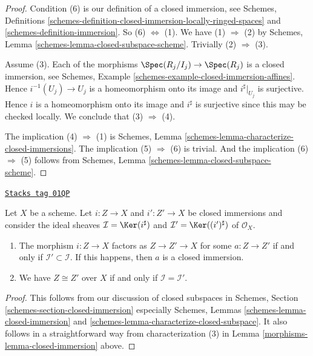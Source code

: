 \begin{proof}
Condition (6) is our definition of a closed immersion, see Schemes,
Definitions \ref{schemes-definition-closed-immersion-locally-ringed-spaces}
and \ref{schemes-definition-immersion}.
So (6) $\Leftrightarrow$ (1). We have (1) $\Rightarrow$ (2) by
Schemes, Lemma \ref{schemes-lemma-closed-subspace-scheme}.
Trivially (2) $\Rightarrow$ (3).

\medskip\noindent
Assume (3). Each of the morphisms
$\Spec(R_j/I_j) \to \Spec(R_j)$ is
a closed immersion, see
Schemes, Example \ref{schemes-example-closed-immersion-affines}.
Hence $i^{-1}(U_j) \to U_j$ is a homeomorphism onto its image
and $i^\sharp|_{U_j}$ is surjective. Hence $i$ is a homeomorphism
onto its image and $i^\sharp$ is surjective since this may be
checked locally. We conclude that (3) $\Rightarrow$ (4).

\medskip\noindent
The implication (4) $\Rightarrow$ (1) is
Schemes, Lemma \ref{schemes-lemma-characterize-closed-immersions}.
The implication (5) $\Rightarrow$ (6) is trivial.
And the implication (6) $\Rightarrow$ (5) follows
from Schemes, Lemma \ref{schemes-lemma-closed-subspace-scheme}.
\end{proof}

\begin{lemma}
\label{morphisms-lemma-closed-immersion-ideals}
\href{https://stacks.math.columbia.edu/tag/01QP}{\texttt{Stacks tag 01QP}}

Let $X$ be a scheme. Let $i : Z \to X$ and $i' : Z' \to X$
be closed immersions and consider the ideal sheaves
$\mathcal{I} = \Ker(i^\sharp)$ and $\mathcal{I}' = \Ker((i')^\sharp)$
of $\mathcal{O}_X$.
\begin{enumerate}
\item The morphism $i : Z \to X$ factors as $Z \to Z' \to X$
for some $a : Z \to Z'$ if and only if $\mathcal{I}' \subset \mathcal{I}$.
If this happens, then $a$ is a closed immersion.
\item We have $Z \cong Z'$ over $X$ if and only if
$\mathcal{I} = \mathcal{I}'$.
\end{enumerate}
\end{lemma}

\begin{proof}

This follows from our discussion of closed subspaces in
Schemes, Section \ref{schemes-section-closed-immersion} especially
Schemes, Lemmas
\ref{schemes-lemma-closed-immersion} and
\ref{schemes-lemma-characterize-closed-subspace}.
It also follows in a straightforward way from characterization
(3) in Lemma \ref{morphisms-lemma-closed-immersion} above.
\end{proof}

